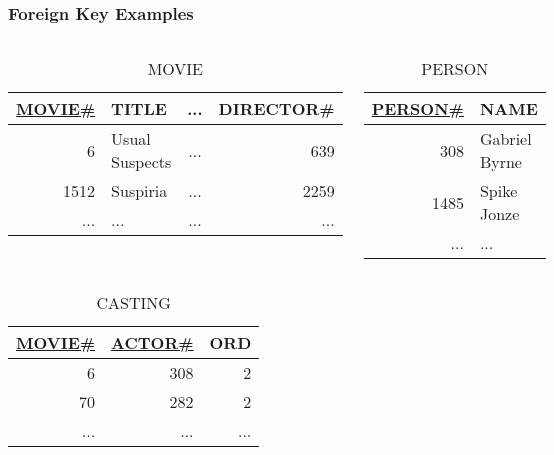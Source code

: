 \documentclass[dvipsnames]{beamer}
\theoremstyle{plain}
\begin{document}
\begin{frame}
  \frametitle{Foreign Key Examples}

  \begin{columns}
    \begin{tiny}
    \begin{table}
      \caption{MOVIE}
      \begin{tabular}{|r|l|c|r|}\hline
\underline{MOVIE\#} & TITLE & ... & DIRECTOR\#\\[2pt]\hline\hline
         6 & Usual Suspects & ... &        639\\\hline
      1512 & Suspiria       & ... &       2259\\\hline
       ... & ...            & ... &        ...\\\hline
      \end{tabular}
    \end{table}
    \end{tiny}

    \begin{tiny}
    \begin{table}
      \caption{PERSON}
      \begin{tabular}{|r|l|}\hline
\underline{PERSON\#} & NAME\\[2pt]\hline\hline
        308 & Gabriel Byrne\\\hline
       1485 & Spike Jonze  \\\hline
        ... & ...          \\\hline
      \end{tabular}
    \end{table}
    \end{tiny}
  \end{columns}

  \begin{tiny}
  \begin{table}
    \caption{CASTING}
    \begin{tabular}{|r|r|r|}\hline
\underline{MOVIE\#} & \underline{ACTOR\#} & ORD\\[2pt]\hline\hline
                  6 &                 308 &   2\\\hline
                 70 &                 282 &   2\\\hline
                ... &                 ... & ...\\\hline
    \end{tabular}
  \end{table}
  \end{tiny}


\end{frame}
\end{document}
